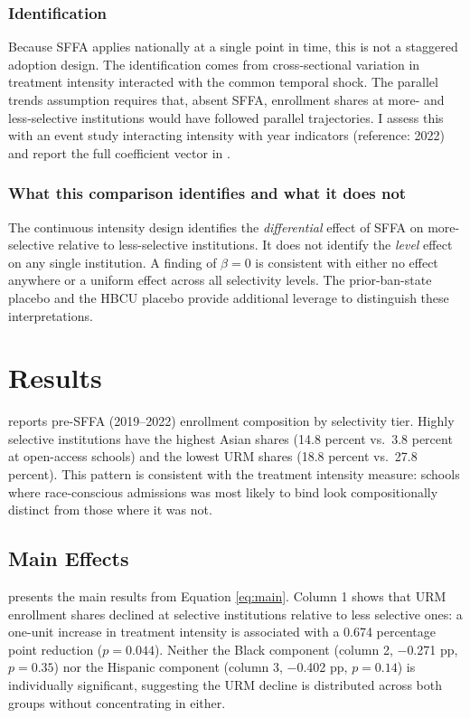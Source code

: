 \documentclass[12pt]{article}
\begin{document}
\subsubsection*{Identification} Because SFFA applies nationally at a single point in time, this is not a staggered adoption design. The identification comes from cross-sectional variation in treatment intensity interacted with the common temporal shock. The parallel trends assumption requires that, absent SFFA, enrollment shares at more- and less-selective institutions would have followed parallel trajectories. I assess this with an event study interacting intensity with year indicators (reference: 2022) and report the full coefficient vector in .

\subsubsection*{What this comparison identifies and what it does not} The continuous intensity design identifies the \textit{differential} effect of SFFA on more-selective relative to less-selective institutions. It does not identify the \textit{level} effect on any single institution. A finding of $\beta = 0$ is consistent with either no effect anywhere or a uniform effect across all selectivity levels. The prior-ban-state placebo and the HBCU placebo provide additional leverage to distinguish these interpretations.

\section{Results}

 reports pre-SFFA (2019--2022) enrollment composition by selectivity tier. Highly selective institutions have the highest Asian shares (14.8 percent vs.\ 3.8 percent at open-access schools) and the lowest URM shares (18.8 percent vs.\ 27.8 percent). This pattern is consistent with the treatment intensity measure: schools where race-conscious admissions was most likely to bind look compositionally distinct from those where it was not.



\subsection{Main Effects}

 presents the main results from Equation \eqref{eq:main}. Column 1 shows that URM enrollment shares declined at selective institutions relative to less selective ones: a one-unit increase in treatment intensity is associated with a 0.674 percentage point reduction ($p = 0.044$). Neither the Black component (column 2, $-$0.271 pp, $p = 0.35$) nor the Hispanic component (column 3, $-$0.402 pp, $p = 0.14$) is individually significant, suggesting the URM decline is distributed across both groups without concentrating in either.
\end{document}
